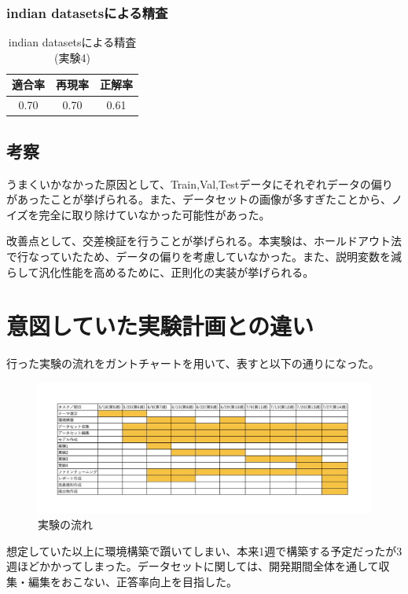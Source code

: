 \documentclass[a4paper, 11pt, titlepage]{jsarticle}
\begin{document}
\subsubsection{indian datasetsによる精査}
\begin{table}[htb]
\centering
  \caption{indian datasetsによる精査(実験4)}
  \begin{tabular}{|c|c|c|}  \hline
    適合率 & 再現率 & 正解率 \\ \hline
    0.70 & 0.70 & 0.61 \\ \hline
  \end{tabular}
\end{table}

\subsection{考察}
うまくいかなかった原因として、Train,Val,Testデータにそれぞれデータの偏りがあったことが挙げられる。また、データセットの画像が多すぎたことから、ノイズを完全に取り除けていなかった可能性があった。\par
改善点として、交差検証を行うことが挙げられる。本実験は、ホールドアウト法で行なっていたため、データの偏りを考慮していなかった。また、説明変数を減らして汎化性能を高めるために、正則化の実装が挙げられる\cite{theme7}。

\clearpage

\section{意図していた実験計画との違い}
行った実験の流れをガントチャートを用いて、表すと以下の通りになった。\par
\begin{figure}[htbp]
\begin{center}
\includegraphics[width=150mm]{G2_Ganttchart.jpeg}
\caption{実験の流れ}
\end{center}
\end{figure}
想定していた以上に環境構築で躓いてしまい、本来1週で構築する予定だったが3週ほどかかってしまった。データセットに関しては、開発期間全体を通して収集・編集をおこない、正答率向上を目指した。
\end{document}
